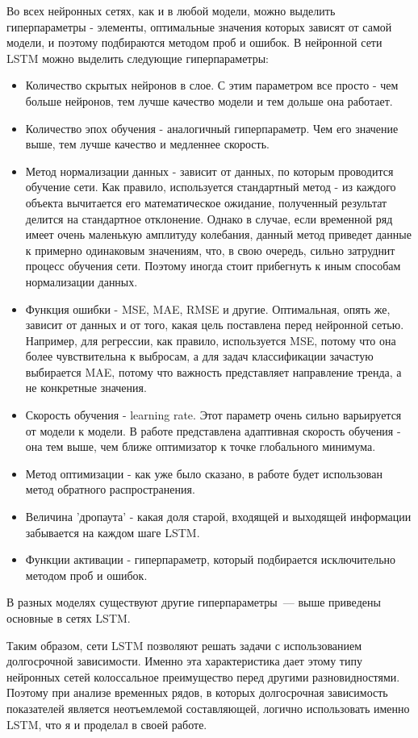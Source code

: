 \documentclass[12pt, a4paper]{article}
\begin{document}
Во всех нейронных сетях, как и в любой модели, можно выделить гиперпараметры - элементы, оптимальные значения которых зависят от самой модели, и поэтому подбираются методом проб и ошибок. В нейронной сети LSTM можно выделить следующие гиперпараметры:
\begin{itemize}
	\item Количество скрытых нейронов в слое. С этим параметром все просто - чем больше нейронов, тем лучше качество модели и тем дольше она работает.
	\item Количество эпох обучения - аналогичный гиперпараметр. Чем его значение выше, тем лучше качество и медленнее скорость.
	\item Метод нормализации данных - зависит от данных, по которым проводится обучение сети. Как правило, используется стандартный метод - из каждого объекта вычитается его математическое ожидание, полученный результат делится на стандартное отклонение. Однако в случае, если временной ряд имеет очень маленькую амплитуду колебания, данный метод приведет данные к примерно одинаковым значениям, что, в свою очередь, сильно затруднит процесс обучения сети. Поэтому иногда стоит прибегнуть к иным способам нормализации данных.
	\item Функция ошибки - MSE, MAE, RMSE и другие. Оптимальная, опять же, зависит от данных и от того, какая цель поставлена перед нейронной сетью. Например, для регрессии, как правило, используется MSE, потому что она более чувствительна к выбросам, а для задач классификации зачастую выбирается MAE, потому что важность представляет направление тренда, а не конкретные значения.
	\item Скорость обучения - learning rate. Этот параметр очень сильно варьируется от модели к модели. В работе представлена адаптивная скорость обучения - она тем выше, чем ближе оптимизатор к точке глобального минимума.
	\item Метод оптимизации - как уже было сказано, в работе будет использован метод обратного распространения.
	\item Величина 'дропаута' - какая доля старой, входящей и выходящей информации забывается на каждом шаге LSTM.
	\item Функции активации - гиперпараметр, который подбирается исключительно методом проб и ошибок.
\end{itemize}

В разных моделях существуют другие гиперпараметры~--- выше приведены основные в сетях LSTM.

Таким образом, сети LSTM позволяют решать задачи с использованием долгосрочной зависимости. Именно эта характеристика дает этому типу нейронных сетей колоссальное преимущество перед другими разновидностями. Поэтому при анализе временных рядов, в которых долгосрочная зависимость показателей является неотъемлемой составляющей, логично использовать именно LSTM, что я и проделал в своей работе.
\end{document}
